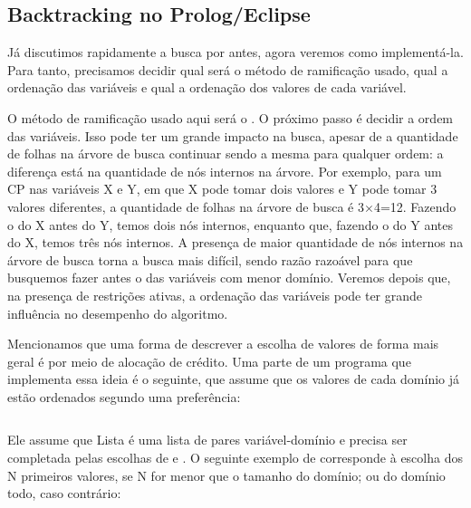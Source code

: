 \subsection{Backtracking no Prolog/Eclipse}

Já discutimos rapidamente a busca por  antes, agora veremos como implementá-la. Para tanto, precisamos decidir qual será o método de ramificação usado, qual a ordenação das variáveis e qual a ordenação dos valores de cada variável.

O método de ramificação usado aqui será o . O próximo passo é decidir a ordem das variáveis. Isso pode ter um grande impacto na busca, apesar de a quantidade de folhas na árvore de busca continuar sendo a mesma para qualquer ordem: a diferença está na quantidade de nós internos na árvore. Por exemplo, para um CP nas variáveis X e Y, em que X pode tomar dois valores e Y pode tomar 3 valores diferentes, a quantidade de folhas na árvore de busca é 3$\times$4=12. Fazendo o
do X antes do Y, temos dois nós internos, enquanto que, fazendo o  do Y antes do X, temos três nós internos. A presença de maior quantidade de nós internos na árvore de busca torna a busca mais difícil, sendo razão razoável para que busquemos fazer antes o  das variáveis com menor domínio. Veremos depois que, na presença de restrições ativas, a ordenação das variáveis pode ter grande influência no desempenho do algoritmo.

Mencionamos que uma forma de descrever a escolha de valores de forma mais geral é por meio de alocação de crédito. Uma parte de um programa que implementa essa ideia é o seguinte, que assume que os valores de cada domínio já estão ordenados segundo uma preferência:

    \begin{listing}
\inputminted{prolog}{../Exemplos/Cap8/prog2_busca2.pl}
    \end{listing}

Ele assume que Lista é uma lista de pares variável-domínio e precisa ser completada pelas escolhas
de  e . O seguinte exemplo de  corresponde à escolha dos N primeiros valores, se N for menor
que o tamanho do domínio; ou do domínio todo,
caso contrário:

    \begin{listing}
\inputminted{prolog}{../Exemplos/Cap8/prog3_partilha.pl}
    \end{listing}

